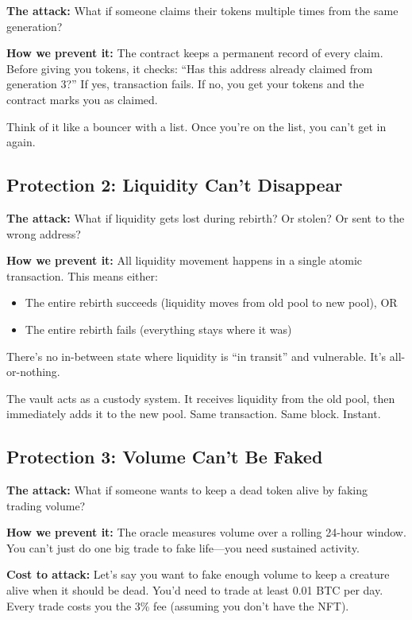 \documentclass[11pt,a4paper]{article}
\begin{document}
\textbf{The attack:} What if someone claims their tokens multiple times from the same generation?

\textbf{How we prevent it:} The contract keeps a permanent record of every claim. Before giving you tokens, it checks: ``Has this address already claimed from generation 3?'' If yes, transaction fails. If no, you get your tokens and the contract marks you as claimed.

Think of it like a bouncer with a list. Once you're on the list, you can't get in again.

\subsection{Protection 2: Liquidity Can't Disappear}

\textbf{The attack:} What if liquidity gets lost during rebirth? Or stolen? Or sent to the wrong address?

\textbf{How we prevent it:} All liquidity movement happens in a single atomic transaction. This means either:
\begin{itemize}
    \item The entire rebirth succeeds (liquidity moves from old pool to new pool), OR
    \item The entire rebirth fails (everything stays where it was)
\end{itemize}

There's no in-between state where liquidity is ``in transit'' and vulnerable. It's all-or-nothing.

The vault acts as a custody system. It receives liquidity from the old pool, then immediately adds it to the new pool. Same transaction. Same block. Instant.

\subsection{Protection 3: Volume Can't Be Faked}

\textbf{The attack:} What if someone wants to keep a dead token alive by faking trading volume?

\textbf{How we prevent it:} The oracle measures volume over a rolling 24-hour window. You can't just do one big trade to fake life---you need sustained activity.

\textbf{Cost to attack:} Let's say you want to fake enough volume to keep a creature alive when it should be dead. You'd need to trade at least 0.01 BTC per day. Every trade costs you the 3\% fee (assuming you don't have the NFT).
\end{document}
